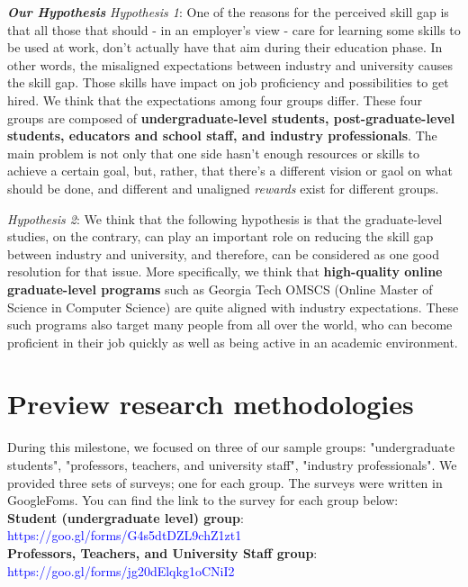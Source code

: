 \documentclass{sigchi}
\begin{document}
\textit{\textbf{Our Hypothesis}}\newline
\textit{Hypothesis 1}: One of the reasons for the perceived skill gap is that all those that should - in an employer's view - care for learning some skills to be used at work, don't actually have that aim during their education phase. In other words, the misaligned expectations between industry and university causes the skill gap. Those skills have impact on job proficiency and possibilities to get hired. We think that the expectations among four groups differ. These four groups are composed of \textbf{undergraduate-level students, post-graduate-level students, educators and school staff, and industry professionals}. The main problem is not only that one side hasn’t enough resources or skills to achieve a certain goal, but, rather, that there’s a different vision or gaol on what should be done, and different and unaligned \textit{rewards} exist for different groups.  

\textit{Hypothesis 2}:  We think that the following hypothesis is that the graduate-level studies, on the contrary, can play an important role on reducing the skill gap between industry and university, and therefore, can be considered as one good resolution for that issue. More specifically, we think that \textbf{high-quality online graduate-level programs} such as Georgia Tech OMSCS (Online Master of Science in Computer Science) are quite aligned with industry expectations. These such programs also target many people from all over the world, who can become proficient in their job quickly as well as being active in an academic environment.

\section{Preview research methodologies}
During this milestone, we focused on three of our sample groups: "undergraduate students", "professors, teachers, and university staff", "industry professionals". We provided three sets of surveys; one for each group. The surveys were written in GoogleFoms. You can find the link to the survey for each group below:\\

\textbf{Student (undergraduate level) group}:\\ \textcolor{blue}{https://goo.gl/forms/G4s5dtDZL9chZ1zt1}\\

\textbf{Professors, Teachers, and University Staff group}: \\ \textcolor{blue}{https://goo.gl/forms/jg20dElqkg1oCNiI2}\\
\end{document}
